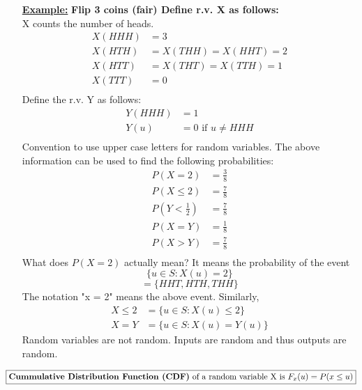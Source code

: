 \documentclass[10pt]{article}
\begin{document}
\begin{flushleft}
\begin{itemize}
    \item[\textbf{\underline{Example:}}] \textbf{Flip 3 coins (fair) Define r.v.
        X as follows:} \\
        X counts the number of heads.
        $$ \begin{aligned}
            X(HHH) &= 3 \\
            X(HTH) &= X(THH) = X(HHT) = 2\\
            X(HTT) &= X(THT) = X(TTH) = 1\\
            X(TTT) &= 0 \\
        \end{aligned} $$
        Define the r.v. Y as follows:
        $$ \begin{aligned}
            Y(HHH) &= 1 \\
            Y(u) &= 0 \text{ if } u \neq HHH\\
        \end{aligned} $$
        Convention to use upper case letters for random variables. The above
        information can be used to find the following probabilities:
        $$ \begin{aligned}
            P( X = 2 ) &= \frac{3}{8} \\
            P( X \leq 2 ) &= \frac{7}{8} \\
            P( Y < \frac{1}{2} ) &= \frac{7}{8} \\
            P( X = Y ) &= \frac{1}{8} \\
            P( X > Y ) &= \frac{7}{8} \\
        \end{aligned}$$
        What does $P(X = 2)$ actually mean? It means the probability of the
        event
        $$ \{ u \in S : X(u) = 2 \}$$
        $$ = \{ HHT, HTH, THH \} $$
        The notation "x = 2" means the above event.
        Similarly,
        $$ \begin{aligned}
            X \leq 2 &= \{ u \in S : X(u) \leq 2 \} \\
            X = Y &= \{ u \in S : X(u) = Y(u) \}
        \end{aligned}$$
        Random variables are not random. Inputs are random and thus outputs are
        random.

\end{itemize}

$$\boxed{ \text{\textbf{Cummulative Distribution Function (CDF)} of a random
variable X is } F_x(u) = P(x \leq u) }$$

\end{flushleft}
\end{document}
